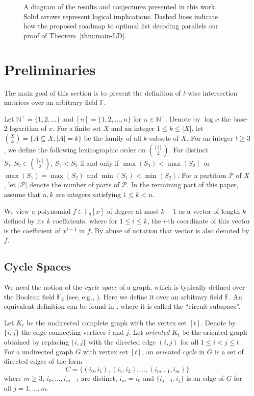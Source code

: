 \documentclass[11pt]{article}
\newcommand\black[1]{{\color{black} #1}}
\newcommand{\N}{{\mathbb{N}}}
\begin{document}
\begin{figure}

\caption{
A diagram of the results and conjectures presented in this work.
Solid arrows represent logical implications.
Dashed lines indicate how the proposed roadmap to optimal list decoding parallels our proof of Theorem~\ref{thm:main-LD}.
}\label{fig:M1}
\end{figure}

\section{Preliminaries}\label{preliminaries}

The main goal of this section is to present the definition of $t$-wise intersection matrices over an arbitrary field $\mathbb{F}$.

Let $\N^+=\{1,2,\dots\}$ and $[n]=\{1,2,\dots, n\}$ for $n\in\N^+$. Denote by $\log x$  the base-$2$ logarithm of $x$. For a finite set $X$ and an integer $1\le k\le |X|$, let $\binom{X}{k}=\{A\subseteq X:|A|=k\}$ be the family of all $k$-subsets of $X$. For an integer $t\ge 3$, we define the following lexicographic order on $\binom{[t]}{2}$. For distinct $S_1,S_2 \in\binom{[t]}{2}$, $S_1< S_2$ if and only if $\max(S_1)<\max(S_2)$ or $\max(S_1)=\max(S_2)$ and $\min(S_1)<\min(S_2)$.
For a partition $\mathcal{P}$ of $X$, let $|\mathcal{P}|$ denote the number of parts of $\mathcal{P}$.
In the remaining part of this paper, assume that $n,k$ are integers satisfying $1\le k<n$.

We view a polynomial $f\in\mathbb{F}_q[x]$ of degree at most $k-1$ as a vector of length $k$ defined by its $k$ coefficients, where for $1\le i\le k$, the $i$-th coordinate of this vector is the coefficient of $x^{i-1}$ in $f$. By abuse of notation that vector is also denoted by $f$.

\subsection{Cycle Spaces}
We need the notion of the {\it cycle space} of a graph, which is typically defined over the Boolean field $\mathbb{F}_2$ (see, e.g.,  \cite{diestel2017graphentheory}). Here we define it over an arbitrary field $\mathbb{F}$. An equivalent definition can be found in \cite{BBNN93}, where it is called the ``circuit-subspace''.

Let $K_t$ be the undirected complete graph with the vertex set $[t]$. Denote by  $\{i,j\}$  the edge connecting vertices $i$ and $j$. Let %
\black{{\it oriented $K_t$}}
be the oriented graph obtained by replacing $\{i,j\}$ with the directed edge $(i,j)$ for all $1\le i < j\le t$.
For a \black{undirected} graph $G$ with vertex set $[t]$, an {\it oriented cycle} in $G$ is a set of directed edges of the form
\[
C=\{(i_0, i_1), (i_1, i_2), \dots, (i_{m-1}, i_m)\}
\]
 where $m\geq 3$, $i_0,\dots,i_{m-1}$ are distinct, $i_m=i_0$ and $\{i_{j-1}, i_j\}$ is an edge of $G$ for all $j=1,\dots,m$.
\end{document}
